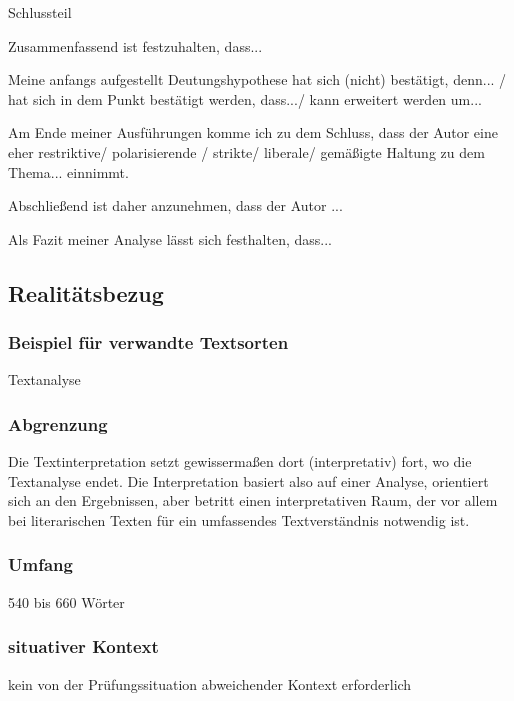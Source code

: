 Schlussteil
\begin{compactitem}
    \item Zusammenfassend ist festzuhalten, dass... 
    \item Meine anfangs aufgestellt Deutungshypothese hat sich (nicht) bestätigt, denn... / hat sich in dem Punkt bestätigt werden, dass.../ kann erweitert werden um... 
    \item Am Ende meiner Ausführungen komme ich zu dem Schluss, dass der Autor eine eher restriktive/ polarisierende / strikte/ liberale/ gemäßigte Haltung zu dem Thema... einnimmt. 
    \item Abschließend ist daher anzunehmen, dass der Autor ... 
    \item Als Fazit meiner Analyse lässt sich festhalten, dass... 
\end{compactitem}

\subsection{Realitätsbezug}

\subsubsection{Beispiel für verwandte Textsorten} Textanalyse
\subsubsection{Abgrenzung} Die Textinterpretation setzt gewissermaßen dort (interpretativ) fort,
wo die Textanalyse endet. Die Interpretation basiert also auf einer Analyse, orientiert sich an den Ergebnissen, aber betritt einen interpretativen Raum, der vor allem bei literarischen Texten für ein umfassendes
Textverständnis notwendig ist.

\subsubsection{Umfang}  540 bis 660 Wörter
\subsubsection{situativer Kontext} kein von der Prüfungssituation abweichender Kontext erforderlich